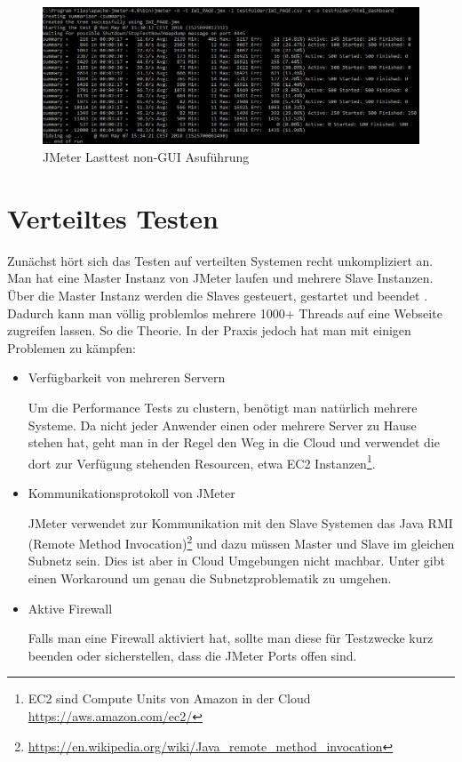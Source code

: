 \documentclass[a4paper,12pt]{article}
\begin{document}
\begin{figure}[htb]%
 \centering
    \includegraphics[width=1\textwidth]{bilder/start_jmeter_cmd.png}
  \caption{JMeter Lasttest non-GUI Asuführung}
  \label{fig:start_jmeter_cmd}
\end{figure}

\section{Verteiltes Testen}
Zunächst hört sich das Testen auf verteilten Systemen recht unkompliziert an. Man hat eine Master Instanz von JMeter laufen und mehrere Slave Instanzen. Über die Master Instanz werden die Slaves gesteuert, gestartet und beendet \cite{online:jmetercloud}. Dadurch kann man völlig problemlos mehrere 1000+ Threads auf eine Webseite zugreifen lassen.
So die Theorie. In der Praxis jedoch hat man mit einigen Problemen zu kämpfen:
\begin{itemize}
  \item Verfügbarkeit von mehreren Servern
	
	Um die Performance Tests zu clustern, benötigt man natürlich mehrere Systeme. Da nicht jeder Anwender einen oder mehrere Server zu Hause stehen hat, geht man in der Regel den Weg in die Cloud und verwendet die dort zur Verfügung stehenden Resourcen, etwa EC2 Instanzen\footnote{EC2 sind Compute Units von Amazon in der Cloud \url{https://aws.amazon.com/ec2/}}.
  \item Kommunikationsprotokoll von JMeter
	
	JMeter verwendet zur Kommunikation mit den Slave Systemen das Java RMI (Remote Method Invocation)\footnote{\url{https://en.wikipedia.org/wiki/Java_remote_method_invocation}} und dazu müssen Master und Slave im gleichen Subnetz sein. Dies ist aber in Cloud Umgebungen nicht machbar. Unter \cite{online:jmetercloud} gibt einen Workaround um genau die Subnetzproblematik zu umgehen. 

	\item Aktive Firewall
	
	Falls man eine Firewall aktiviert hat, sollte man diese für Testzwecke kurz beenden oder sicherstellen, dass die JMeter Ports offen sind. 
\end{itemize}
\end{document}
